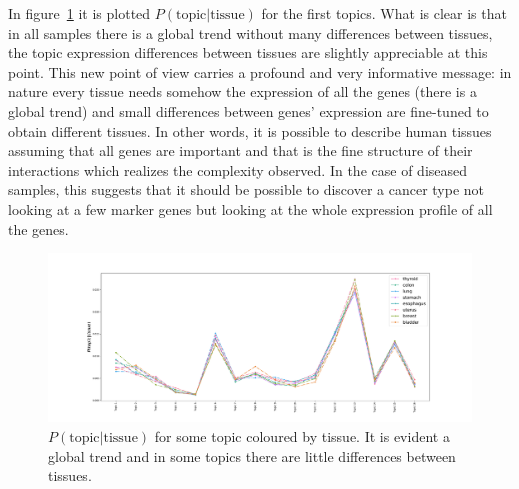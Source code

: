 In figure~\ref{fig:topic/merged/lifeplot} it is plotted $P(\text{topic}| \text{tissue})$ for the first topics. What is clear is that in all samples there is a global trend without many differences between tissues, the topic expression differences between tissues are slightly appreciable at this point. This new point of view carries a profound and very informative message: in nature every tissue needs somehow the expression of all the genes (there is a global trend) and small differences between genes' expression are fine-tuned to obtain different tissues. In other words, it is possible to describe human tissues assuming that all genes are important and that is the fine structure of their interactions which realizes the complexity observed. In the case of diseased samples, this suggests that it should be possible to discover a cancer type not looking at a few marker genes but looking at the whole expression profile of all the genes.
\begin{figure}[htb!]
	\centering
	\includegraphics[width=0.95\linewidth]{pictures/topic/merged/lifeplot.pdf}
	\caption{$P(\text{topic} | \text{tissue})$ for some topic coloured by tissue. It is evident a global trend and in some topics there are little differences between tissues.}
	\label{fig:topic/merged/lifeplot}
\end{figure}

